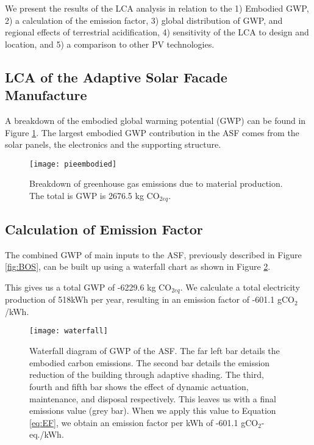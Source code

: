 
We present the results of the LCA analysis in relation to the 1) Embodied GWP, 2) a calculation of the emission factor, 3) global distribution of GWP, and regional effects of terrestrial acidification, 4) sensitivity of the LCA to design and location, and 5) a comparison to other PV technologies.

\subsection{LCA of the Adaptive Solar Facade Manufacture}

A breakdown of the embodied global warming potential (GWP) can be found in Figure  \ref{fig:embodied}. The largest embodied GWP contribution in the ASF comes from the solar panels, the electronics and the supporting structure.

\begin{figure}[H]
\begin{center}
\texttt{[image: pieembodied]}
\caption{Breakdown of greenhouse gas emissions due to material production. The total is GWP is 2676.5 kg CO$_{2eq}$.}
\label{fig:embodied}
\end{center}
\end{figure}

\subsection{Calculation of Emission Factor}
The combined GWP of main inputs to the ASF, previously described in Figure \ref{fig:BOS}, can be built up using a waterfall chart as shown in Figure \ref{fig:waterfall}. 

This gives us a total GWP of -6229.6 kg CO$_{2eq}$. We calculate a total electricity production of 518kWh per year, resulting in an emission factor of -601.1 gCO${_2}$/kWh.

\begin{figure}[H]
\begin{center}
\texttt{[image: waterfall]}
\caption{Waterfall diagram of GWP of the ASF. The far left bar details the embodied carbon emissions. The second bar details the emission reduction of the building through adaptive shading. The third, fourth and fifth bar shows the effect of dynamic actuation, maintenance, and disposal respectively. This leaves us with a final emissions value (grey bar). When we apply this value to Equation \ref{eq:EF}, we obtain an emission factor per kWh of -601.1 gCO$_2$-eq./kWh.}

\label{fig:waterfall}
\end{center}
\end{figure}

